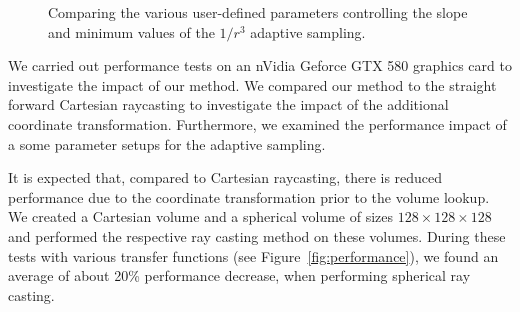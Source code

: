 \documentclass{egpubl}
\begin{document}
\begin{figure}
{	}
	\caption{Comparing the various user-defined parameters controlling the slope and minimum values of the $1/r^3$ adaptive sampling.}
	\label{fig:performance:adaptive}
\end{figure}

We carried out performance tests on an nVidia Geforce GTX 580 graphics card to investigate the impact of our method. We compared our method to the straight forward Cartesian raycasting to investigate the impact of the additional coordinate transformation. Furthermore, we examined the performance impact of a some parameter setups for the adaptive sampling.

It is expected that, compared to Cartesian raycasting, there is reduced performance due to the coordinate transformation prior to the volume lookup. We created a Cartesian volume and a spherical volume of sizes $128 \times 128 \times 128$ and performed the respective ray casting method on these volumes. During these tests with various transfer functions (see Figure~\ref{fig:performance}), we found an average of about 20\% performance decrease, when performing spherical ray casting.
\end{document}
